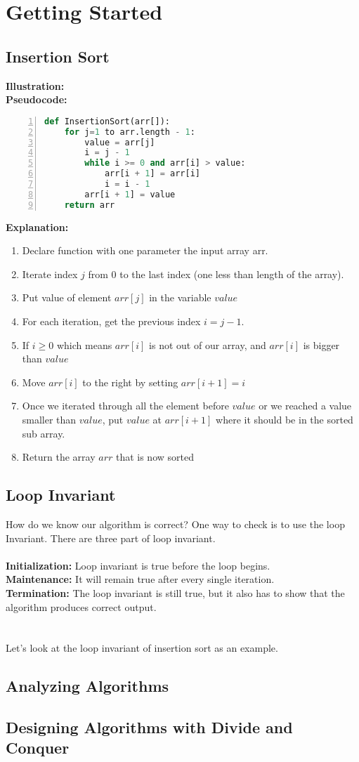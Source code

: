 \chapter{Getting Started}
\section{Insertion Sort}
\textbf{Illustration:} 
\\
\textbf{Pseudocode:}  
\begin{lstlisting}[language=Python, numbers=left]
def InsertionSort(arr[]):
	for j=1 to arr.length - 1:
		value = arr[j]
		i = j - 1
		while i >= 0 and arr[i] > value:
			arr[i + 1] = arr[i]
			i = i - 1
		arr[i + 1] = value
	return arr
\end{lstlisting}
\textbf{Explanation:}
\begin{enumerate}
	\item Declare function with one parameter the input array arr.
	\item Iterate index $j$ from 0 to the last index (one less than length of the array).
	\item Put value of element $arr[j]$ in the variable $value$ 
	\item For each iteration, get the previous index $i=j-1$.
	\item If $i\geq0$ which means $arr[i]$ is not out of our array, and $arr[i]$ is bigger than $value$
	\item Move $arr[i]$ to the right by setting $arr[i+1]=i$
	\item Once we iterated through all the element before $value$ or we reached a value smaller than $value$, put $value$ at $arr[i+1]$ where it should be in the sorted sub array.
	\item Return the array $arr$ that is now sorted
\end{enumerate} 

\section{Loop Invariant}
How do we know our algorithm is correct? One way to check is to use the loop Invariant. There are 
three part of loop invariant. \\\\
\textbf{Initialization:} Loop invariant is true before the loop begins.\\
\textbf{Maintenance:} It will remain true after every single iteration.\\
\textbf{Termination:} The loop invariant is still true, but it also has to show that the algorithm produces correct output.\\\\
\\ 
Let's look at the loop invariant of insertion sort as an example.\\

\section{Analyzing Algorithms}
\section{Designing Algorithms with Divide and Conquer}